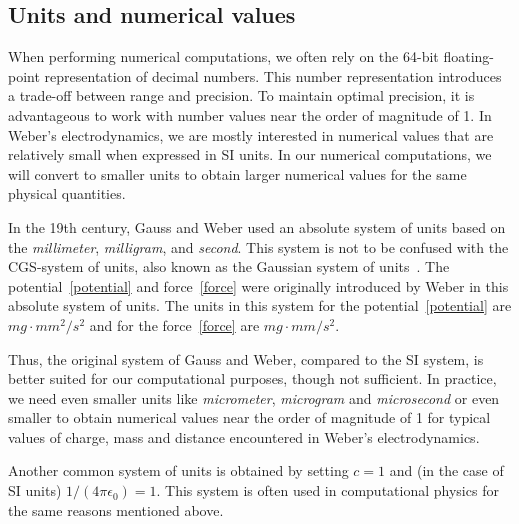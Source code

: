 \documentclass[12pt,a4paper]{article}
\theoremstyle{definition}
\theoremstyle{remark}
\begin{document}
\subsection{Units and numerical values}\label{units}
When performing numerical computations, we often rely on the 64-bit floating-point representation of decimal numbers. This number representation introduces a trade-off between range and precision. To maintain optimal precision, it is advantageous to work with number values near the order of magnitude of 1. In Weber's electrodynamics, we are mostly interested in numerical values that are relatively small when expressed in SI units. In our numerical computations, we will convert to smaller units to obtain larger numerical values for the same physical quantities.

In the 19th century, Gauss and Weber used an absolute system of units based on the \textit{millimeter}, \textit{milligram}, and \textit{second}. This system is not to be confused with the CGS-system of units, also known as the Gaussian system of units~\citep{assis-weber-vol1}. The potential~\eqref{potential} and force~\eqref{force} were originally introduced by Weber in this absolute system of units. The units in this system for the potential~\eqref{potential} are $mg \cdot mm^2 / s^2$ and for the force~\eqref{force} are $mg \cdot mm / s^2$.

Thus, the original system of Gauss and Weber, compared to the SI system, is better suited for our computational purposes, though not sufficient. In practice, we need even smaller units like \textit{micrometer}, \textit{microgram} and \textit{microsecond} or even smaller to obtain numerical values near the order of magnitude of 1 for typical values of charge, mass and distance encountered in Weber's electrodynamics.

Another common system of units is obtained by setting $c = 1$ and (in the case of SI units) $1/(4\pi \epsilon_0) = 1$. This system is often used in computational physics for the same reasons mentioned above.
\end{document}
